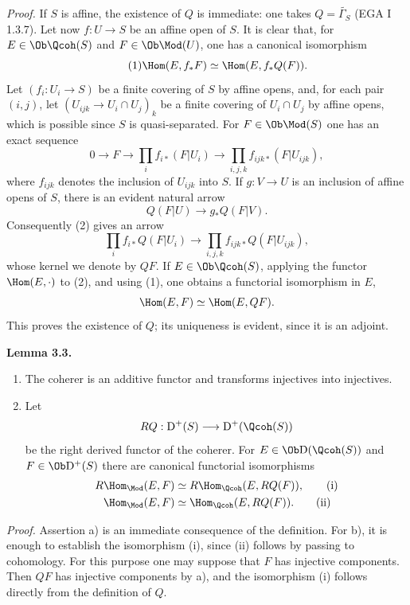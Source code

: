 \documentclass[11pt]{article}
\begin{document}
\emph{Proof.} If $S$ is affine, the existence of $Q$ is immediate: one takes $Q=\widetilde{\Gamma_S}$ (EGA I 1.3.7). Let now $f:U\to S$ be an affine open of $S$. It is clear that, for $E\in\Ob\Qcoh(S)$ and $F\in\Ob\Mod(U)$, one has a canonical isomorphism
\begin{equation}\tag{1}
 \Hom(E,f_*F)\simeq \Hom(E,f_*Q(F)).
\end{equation}
Let $(f_i:U_i\to S)$ be a finite covering of $S$ by affine opens, and, for each pair $(i,j)$, let $(U_{ijk}\to U_i\cap U_j)_k$ be a finite covering of $U_i\cap U_j$ by affine opens, which is possible since $S$ is quasi-separated. For $F\in\Ob\Mod(S)$ one has an exact sequence
\begin{equation}\tag{2}
 0\longrightarrow F\longrightarrow \prod_i f_{i*}(F|U_i)
 \longrightarrow \prod_{i,j,k}f_{ijk*}(F|U_{ijk}),
\end{equation}
where $f_{ijk}$ denotes the inclusion of $U_{ijk}$ into $S$. If $g:V\to U$ is an inclusion of affine opens of $S$, there is an evident natural arrow
\[
 Q(F|U)\longrightarrow g_*Q(F|V).
\]
Consequently (2) gives an arrow
\begin{equation}\tag{3}
 \prod_i f_{i*}Q(F|U_i)\longrightarrow
 \prod_{i,j,k}f_{ijk*}Q(F|U_{ijk}),
\end{equation}
whose kernel we denote by $QF$. If $E\in\Ob\Qcoh(S)$, applying the functor $\Hom(E,\cdot)$ to (2), and using (1), one obtains a functorial isomorphism in $E$,
\[
 \Hom(E,F)\simeq\Hom(E,QF).
\]
This proves the existence of $Q$; its uniqueness is evident, since it is an adjoint.

\textbf{Lemma 3.3.} \begin{enumerate}[label=\alph*)]
\item The coherer is an additive functor and transforms injectives into injectives.
\item Let
\[
 RQ:\mathrm D^+(S)\longrightarrow \mathrm D^+(\Qcoh(S))
\]
be the right derived functor of the coherer. For $E\in\Ob\mathrm D(\Qcoh(S))$ and $F\in\Ob\mathrm D^+(S)$ there are canonical functorial isomorphisms
\begin{align}
 R\Hom_{\Mod}(E,F)&\simeq R\Hom_{\Qcoh}(E,RQ(F)), \tag{i}\\
 \Hom_{\Mod}(E,F)&\simeq \Hom_{\Qcoh}(E,RQ(F)). \tag{ii}
\end{align}
\end{enumerate}

\emph{Proof.} Assertion a) is an immediate consequence of the definition. For b), it is enough to establish the isomorphism (i), since (ii) follows by passing to cohomology. For this purpose one may suppose that $F$ has injective components. Then $QF$ has injective components by a), and the isomorphism (i) follows directly from the definition of $Q$.
\end{document}
